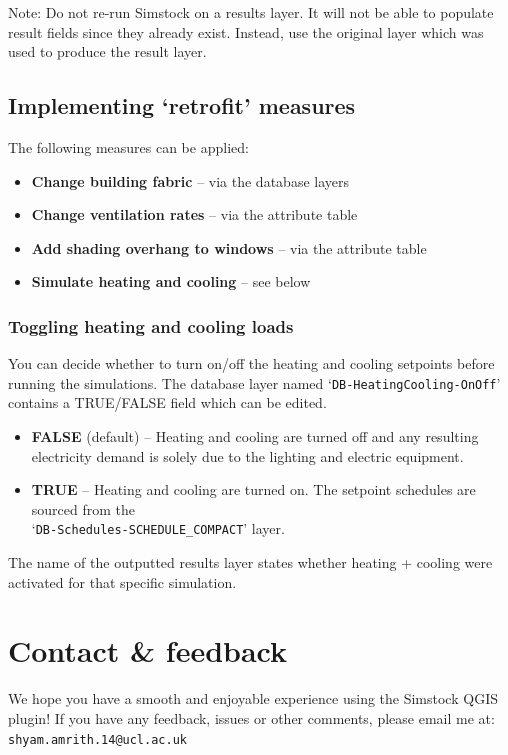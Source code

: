\documentclass{article}
\begin{document}
Note: Do not re-run Simstock on a results layer. It will not be able to populate result fields since they already exist. Instead, use the original layer which was used to produce the result layer.


\clearpage
\subsection{Implementing `retrofit' measures}
The following measures can be applied:
\begin{itemize}
    \item \textbf{Change building fabric} -- via the database layers
    \item \textbf{Change ventilation rates} -- via the attribute table
    \item \textbf{Add shading overhang to windows} -- via the attribute table
    \item \textbf{Simulate heating and cooling} -- see below
\end{itemize}

\subsubsection{Toggling heating and cooling loads}
\label{section:heatingcoolingtoggle}
You can decide whether to turn on/off the heating and cooling setpoints before running the simulations. The database layer named `\texttt{DB-HeatingCooling-OnOff}' contains a TRUE/FALSE field which can be edited.
\begin{itemize}
    \item \textbf{FALSE} (default) -- Heating and cooling are turned off and any resulting electricity demand is solely due to the lighting and electric equipment.
    \item \textbf{TRUE} -- Heating and cooling are turned on. The setpoint schedules are sourced from the \\
    `\texttt{DB-Schedules-SCHEDULE\_COMPACT}' layer.
\end{itemize}

The name of the outputted results layer states whether heating + cooling were activated for that specific simulation.

\section{Contact \& feedback}
We hope you have a smooth and enjoyable experience using the Simstock QGIS plugin! If you have any feedback, issues or other comments, please email me at: \texttt{shyam.amrith.14@ucl.ac.uk}
\end{document}
